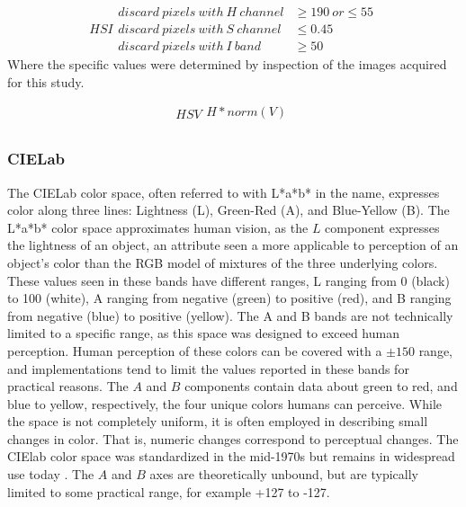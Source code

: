 \documentclass[letterpaper, notitlepage]{report}
\begin{document}
{\begin{equation}\label{eqn:index-hsi}
	HSI
    \begin{split}
		discard~pixels~with~H~channel &\geq 190~or \leq 55\\
		discard~pixels~with~S~channel &\leq 0.45 \\
		discard~pixels~with~I~band &\geq 50
    \end{split}
\end{equation}
Where the specific values were determined by inspection of the images acquired for this study.

\begin{equation}\label{eqn:index-hsv}
	HSV
	\begin{split}
		H * norm(V) \\
	\end{split}
\end{equation}

\subsubsection{CIELab}
The CIELab color space, often referred to with L*a*b* in the name, expresses color along three lines: Lightness (L), Green-Red (A), and Blue-Yellow (B). The L*a*b* color space approximates human vision, as the $L$ component expresses  the lightness of an object, an attribute seen a more applicable to perception of an object's color than the RGB model of mixtures of the three underlying colors.  These values seen in these bands have different ranges, L ranging from 0 (black) to 100 (white), A ranging from negative (green) to positive (red), and B ranging from negative (blue) to positive (yellow). The A and B bands are not technically limited to a specific range, as this space was designed to exceed human perception. Human perception of these colors can be covered with a $\pm 150$ range, and implementations tend to limit the values reported in these bands for practical reasons.  The $A$ and $B$ components contain data about green to red, and blue to yellow, respectively, the four unique colors humans can perceive. While the space is not completely uniform, it is often employed in describing small changes in color. That is, numeric changes correspond to perceptual changes. The CIElab color space was standardized in the mid-1970s but remains in widespread use today \cite{Leilich2023-lf}.  The $A$ and $B$ axes are theoretically unbound, but are typically limited to some practical range, for example +127 to -127. 

}
\end{document}
